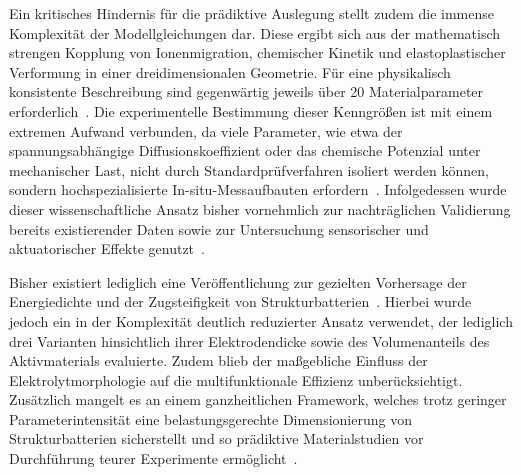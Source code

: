 Ein kritisches Hindernis für die prädiktive Auslegung stellt zudem die immense Komplexität der Modellgleichungen dar. Diese ergibt sich aus der mathematisch strengen Kopplung von Ionenmigration, chemischer Kinetik und elastoplastischer Verformung in einer dreidimensionalen Geometrie. Für eine physikalisch konsistente Beschreibung sind gegenwärtig jeweils über 20 Materialparameter erforderlich~\cite{Greenhalgh2024a}. Die experimentelle Bestimmung dieser Kenngrößen ist mit einem extremen Aufwand verbunden, da viele Parameter, wie etwa der spannungsabhängige Diffusionskoeffizient oder das chemische Potenzial unter mechanischer Last, nicht durch Standardprüfverfahren isoliert werden können, sondern hochspezialisierte In-situ-Messaufbauten erfordern~\cite{Carlstedt2019a, Duan2021}. Infolgedessen wurde dieser wissenschaftliche Ansatz bisher vornehmlich zur nachträglichen Validierung bereits existierender Daten sowie zur Untersuchung sensorischer und aktuatorischer Effekte genutzt~\cite{Carlstedt2023}.

Bisher existiert lediglich eine Veröffentlichung zur gezielten Vorhersage der Energiedichte und der Zugsteifigkeit von Strukturbatterien~\cite{Carlstedt2018}. Hierbei wurde jedoch ein in der Komplexität deutlich reduzierter Ansatz verwendet, der lediglich drei Varianten hinsichtlich ihrer Elektrodendicke sowie des Volumenanteils des Aktivmaterials evaluierte. Zudem blieb der maßgebliche Einfluss der Elektrolytmorphologie auf die multifunktionale Effizienz unberücksichtigt. 
Zusätzlich mangelt es an einem ganzheitlichen Framework, welches trotz geringer Parameterintensität eine belastungsgerechte Dimensionierung von Strukturbatterien sicherstellt und so prädiktive Materialstudien vor Durchführung teurer Experimente ermöglicht~\cite{zschiebsch2022networking,zschiebsch2022summerschool,zschiebsch2022digital,zschiebsch2023fast_journal, zschiebsch2023fast_conf}.
